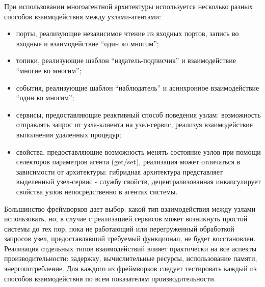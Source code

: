 \begin{description}[noitemsep]
	\item [Тип взаимодействия между узлами.] При использовании многоагентной архитектуры используется несколько разных способов взаимодействия между узлами-агентами:
	\begin{itemize}[noitemsep]
		\item порты, реализующие независимое чтение из входных портов, запись во входные и взаимодействие \enquote{один ко многим};
		\item топики, реализующие шаблон \enquote{издатель-подписчик} и взаимодействие \enquote{многие ко многим};
		\item события, реализующие шаблон \enquote{наблюдатель} и асинхронное взаимодействие \enquote{один ко многим};
		\item сервисы, предоставляющие реактивный способ поведения узлам: возможность отправлять запрос от узла-клиента на узел-сервис, реализуя взаимодействие выполнения удаленных процедур;
		\item свойства, предоставляющие возможность менять состояние узлов при помощи селекторов параметров агента (get/set), реализация может отличаться в зависимости от архитектуры: гибридная архитектура представляет выделенный узел-сервис - службу свойств, децентрализованная инкапсулирует свойства узлов непосредственно в агентах системы.
	\end{itemize}
	
	Большинство фреймворков дает выбор: какой тип взаимодействия между узлами использовать, но, в случае с реализацией сервисов может возникнуть простой системы до тех пор, пока не работающий или перегруженный обработкой запросов узел, предоставлявший требуемый функционал, не будет восстановлен. Реализация отдельных типов взаимодействий влияет практически на все аспекты производительности: задержку, вычислительные ресурсы, использование памяти, энергопотребление. Для каждого из фреймворков следует тестировать каждый из способов взаимодействия по всем показателям производительности.


\end{description}
